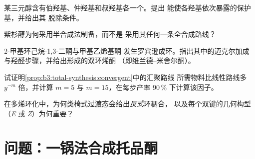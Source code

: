 \begin{exercise}[$\star\star$]\label{exo:b3:total-synthesis:8}
某三元醇含有伯羟基、仲羟基和叔羟基各一个。提出
能使各羟基依次暴露的保护基，并给出其
脱除条件。
\end{exercise}

\begin{exercise}[$\star\star$]\label{exo:b3:total-synthesis:9}
紫杉醇为何采用半合成法制备，而不是
采用其任何一条全合成路线？
\end{exercise}

\begin{exercise}[$\star\star\star$]\label{exo:b3:total-synthesis:10}
2-甲基环己烷-1,3-二酮与甲基乙烯基酮
发生罗宾逊成环。指出其中的迈克尔加成与羟醛步骤，并给出形成的双环烯酮
（即维兰德–米舍尔酮）。
\end{exercise}

\begin{exercise}[$\star\star\star$]\label{exo:b3:total-synthesis:11}
试证明\cref{prop:b3:total-synthesis:convergent}中的汇聚路线
所需物料比线性路线多 $y^{-m}$ 倍，并计算 $m = 5$ 与
$m = 15$，在每步产率 90\,\% 下计算该因子。
\end{exercise}

\begin{exercise}[$\star\star\star$]\label{exo:b3:total-synthesis:12}
在多烯环化中，为何类椅式过渡态会给出\textit{反式}环稠合，
以及每个双键的几何构型（\textit{E} 或 \textit{Z}）为何重要？
\end{exercise}

\section{问题：一锅法合成托品酮}

